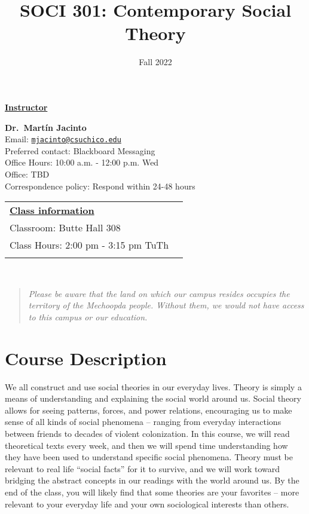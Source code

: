 \documentclass[11pt,]{article}
\title{SOCI 301: Contemporary Social Theory}
\date{Fall 2022}
\begin{document}
  

		\maketitle
		
	
		\thispagestyle{firststyle}

\textbf{\underline{Instructor}}
\begin{multicols}{2}

  \textbf{Dr.~Martín Jacinto}\\
  Email: \href{mailto:mjacinto@csuchico.edu}{\nolinkurl{mjacinto@csuchico.edu}}\\
  Preferred contact: Blackboard Messaging\\
  Office Hours: 10:00 a.m. - 12:00 p.m. Wed\\
  Office: TBD\\
  Correspondence policy: Respond within 24-48 hours\\
    \columnbreak
    
  \end{multicols}
	
\noindent \begin{tabular*}{\textwidth}{ @{\extracolsep{\fill}} lr @{\extracolsep{\fill}}}
\textbf{\underline{Class information}}\\
  Classroom: Butte Hall 308\\
  Class Hours: 2:00 pm - 3:15 pm TuTh\\
    \\
	\end{tabular*}\\


\vspace{2mm}


\begin{quote}
\emph{Please be aware that the land on which our campus resides occupies
the territory of the Mechoopda people. Without them, we would not have
access to this campus or our education.}
\end{quote}

\hypertarget{course-description}{%
\section{Course Description}\label{course-description}}

We all construct and use social theories in our everyday lives. Theory
is simply a means of understanding and explaining the social world
around us. Social theory allows for seeing patterns, forces, and power
relations, encouraging us to make sense of all kinds of social phenomena
-- ranging from everyday interactions between friends to decades of
violent colonization. In this course, we will read theoretical texts
every week, and then we will spend time understanding how they have been
used to understand specific social phenomena. Theory must be relevant to
real life ``social facts'' for it to survive, and we will work toward
bridging the abstract concepts in our readings with the world around us.
By the end of the class, you will likely find that some theories are
your favorites -- more relevant to your everyday life and your own
sociological interests than others.
\end{document}

